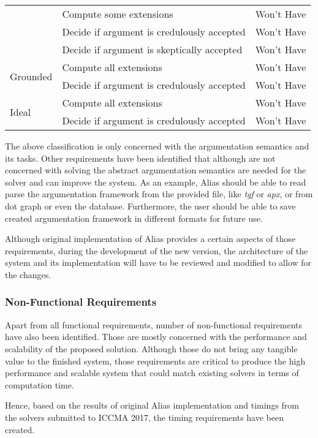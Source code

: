 \begin{table}[]
\begin{tabular}{|l|l|l|}
		& Compute some extensions                          & Won't Have      \\ \cline{2-3} 
		& Decide if argument is credulously accepted & Won't Have      \\ \cline{2-3} 
		& Decide if argument is skeptically accepted & Won't Have      \\ \hline
		\multirow{2}{*}{Grounded}    & Compute all extensions                           & Won't Have      \\ \cline{2-3} 
		& Decide if argument is credulously accepted & Won't Have      \\ \hline
		\multirow{2}{*}{Ideal}       & Compute all extensions                           & Won't Have      \\ \cline{2-3} 
		& Decide if argument is credulously accepted & Won't Have      \\ \hline
	\end{tabular}
\end{table}


The above classification is only concerned with the argumentation semantics and its tasks. Other requirements have been identified that although are not concerned with solving the abstract argumentation semantics are needed for the solver and can improve the system. As an example, Alias should be able to read parse the argumentation framework from the provided file, like \textit{tgf} or \textit{apx}, or from dot graph or even the database. Furthermore, the user should be able to save created argumentation framework in different formats for future use. 

Although original implementation of Alias provides a certain aspects of those requirements, during the development of the new version, the architecture of the system and its implementation will have to be reviewed and modified to allow for the changes.

\subsubsection{Non-Functional Requirements}
Apart from all functional requirements, number of non-functional requirements have also been identified. Those are mostly concerned with the performance and scalability of the proposed solution. Although those do not bring any tangible value to the finished system, those requirements are critical to produce the high performance and scalable system that could match existing solvers in terms of computation time. 

Hence, based on the results of original Alias implementation and timings from the solvers submitted to ICCMA 2017, the timing requirements have been created. 
